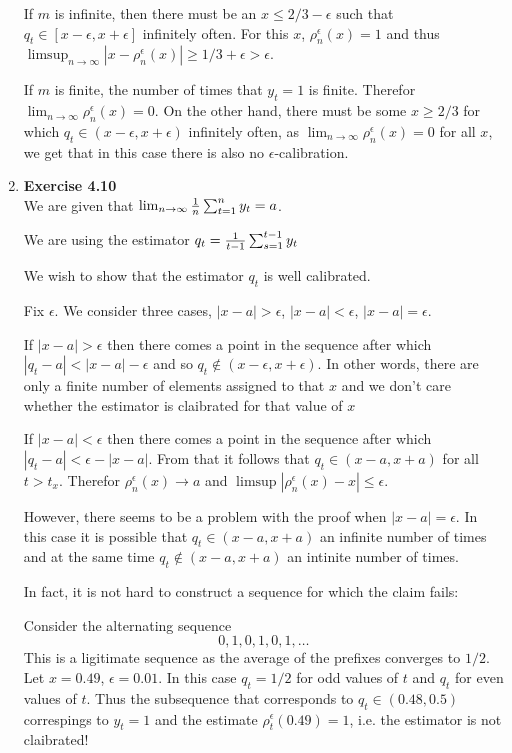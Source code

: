 \documentclass[12pt]{article}
\begin{document}
\begin{enumerate}
If $m$ is infinite, then there must be an $x \leq 2/3-\epsilon$ such
that $q_t \in [x-\epsilon,x+\epsilon]$ infinitely often. For this $x$,
$\rho_n^{\epsilon}(x)=1$ and thus $\limsup_{n \to
  \infty}|x-\rho_n^{\epsilon}(x)| \geq 1/3 + \epsilon > \epsilon$.

If $m$ is finite, the number of times that $y_t=1$ is finite. Therefor
$\lim_{n \to \infty} \rho_n^{\epsilon}(x)=0$. On the other hand, there
must be some $x \geq 2/3$ for which $q_t \in (x-\epsilon,x+\epsilon)$
infinitely often, as $\lim_{n \to \infty} \rho_n^{\epsilon}(x)=0$ for
all $x$, we get that in this case there is also no $\epsilon$-calibration.

\item {\bf Exercise 4.10}\\

We are given that $\lim_{n \to \infty} {1 \over n} \sum_{t=1}^n y_t =a$.

We are using the estimator $q_t = {1 \over t-1} \sum_{s=1}^{t-1} y_t$

We wish to show that the estimator $q_t$ is well calibrated.

Fix $\epsilon$. We consider three cases, $|x-a| > \epsilon$, $|x-a| < \epsilon$,
$|x-a| = \epsilon$.

If $|x-a| > \epsilon$ then there comes a point in the sequence after which
$|q_t-a| < |x-a| - \epsilon$ and so $q_t \notin
(x-\epsilon,x+\epsilon)$. In other words, there are only a finite
number of elements assigned to that $x$ and we don't care whether the
estimator is claibrated for that value of $x$

If $|x-a| < \epsilon$ then there comes a point in the sequence after
which $|q_t - a| < \epsilon - |x-a|$. From that it follows
that $q_t \in (x-a,x+a)$ for all $t>t_x$. Therefor
$\rho_n^{\epsilon}(x) \to a$ and $\limsup | \rho_n^\epsilon (x)-x |
\leq \epsilon$.

However, there seems to be a problem with the proof when $|x-a|
=\epsilon$. In this case it is possible that $q_t \in (x-a,x+a)$ an
infinite number of times and at the same time $q_t \notin (x-a,x+a)$
an intinite number of times.

In fact, it is not hard to construct a sequence for which the claim fails:

Consider the alternating sequence 
\[
0,1,0,1,0,1,\ldots
\]
This is a ligitimate sequence as the average of the prefixes converges
to $1/2$. Let $x=0.49$, $\epsilon=0.01$. In this case $q_t=1/2$ for
odd values of $t$ and $q_t$ for even values of $t$. Thus the
subsequence that corresponds to $q_t \in (0.48,0.5)$ correspings to
$y_t=1$ and the estimate $\rho_t^{\epsilon}(0.49)=1$, i.e. the
estimator is not claibrated!

\end{enumerate}
\end{document}
